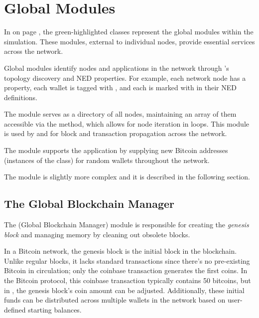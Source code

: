 \section{Global Modules}\label{sec:impl-global}

In  on page \pageref{fig:app-uml}, the green-highlighted
classes represent the global modules within the simulation. These modules,
external to individual nodes, provide essential services across the network.

Global modules identify nodes and applications in the network through
\omnetpp{}'s topology discovery and NED properties. For example, each network
node has a  property, each wallet is tagged with
, and each  is marked with
 in their NED definitions.

The  module serves as a directory of all nodes, maintaining
an array of them accessible via the  method, which allows for
node iteration in loops. This module is used by  and
 for block and transaction propagation across the network.

The  module supports the 
application by supplying new Bitcoin addresses (instances of the
 class) for random wallets throughout the network.

The  module is slightly more complex and it is described in the
following section.

\subsection{The Global Blockchain Manager}\label{subsec:impl-global-gbm}

The  (Global Blockchain Manager) module is responsible for creating
the \emph{genesis block} and managing memory by cleaning out obsolete blocks.

In a Bitcoin network, the genesis block is the initial block in the blockchain.
Unlike regular blocks, it lacks standard transactions since there's no
pre-existing Bitcoin in circulation; only the coinbase transaction generates
the first coins. In the Bitcoin protocol, this coinbase transaction typically
contains 50 bitcoins, but in \iblock{}, the genesis block's coin amount can be
adjusted. Additionally, these initial funds can be distributed across multiple
wallets in the network based on user-defined starting balances.

